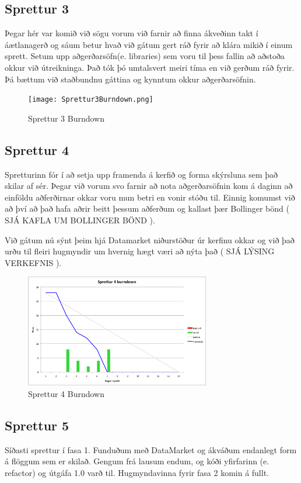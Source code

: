 \documentclass{article}
\begin{document}
\subsection{Sprettur 3}
Þegar hér var komið við sögu vorum við farnir að finna ákveðinn takt í áætlanagerð og sáum betur hvað við gátum gert ráð fyrir að klára mikið 
í einum sprett. Setum upp aðgerðarsöfn(e. libraries) sem voru til þess fallin að aðstoða okkur við útreikninga. Það tók þó umtalsvert meiri tíma en við gerðum
ráð fyrir. Þá bættum við staðbundnu gáttina og kynntum okkur aðgerðarsöfnin.
\begin{figure}[H]
 \centering
 \texttt{[image: Sprettur3Burndown.png]}
 \caption{Sprettur 3 Burndown}
\end{figure}
\subsection{Sprettur 4}
Spretturinn fór í að setja upp framenda á kerfið og forma skýrsluna sem það skilar af sér. Þegar við vorum svo farnir að nota aðgerðarsöfnin 
kom á daginn að einföldu aðferðirnar okkar voru mun betri en vonir stóðu til. Einnig komumst við að því að það hafa aðrir beitt þessum aðferðum 
og kallast þær Bollinger bönd ( SJÁ KAFLA UM BOLLINGER BÖND ). 

Við gátum nú sýnt þeim hjá Datamarket niðurstöður úr kerfinu okkar og við það urðu til fleiri hugmyndir um hvernig hægt væri að nýta það ( SJÁ LÝSING VERKEFNIS ).

\begin{figure}[H]
 \centering
 \includegraphics[width=0.72\textwidth]{Sprettur4_Burndown.png}
 \caption{Sprettur 4 Burndown}
\end{figure}

\subsection{Sprettur 5}
Síðasti sprettur í fasa 1. Funduðum með DataMarket og ákváðum endanlegt form á flöggum sem er skilað. Gengum frá lausum endum, og kóði yfirfarinn 
(e. refactor) og útgáfa 1.0 varð til. Hugmyndavinna fyrir fasa 2 komin á fullt.
\end{document}
